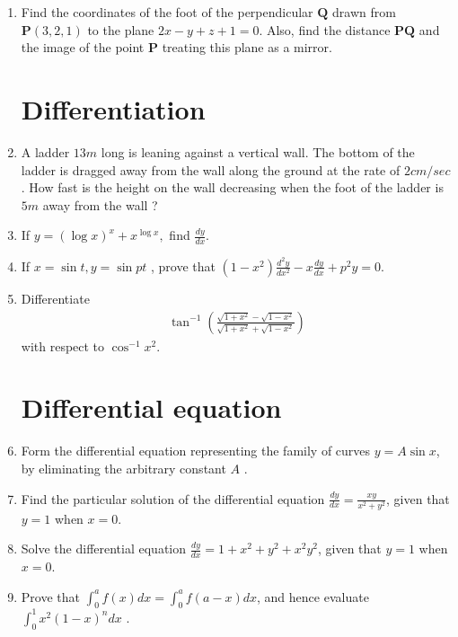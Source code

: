 \documentclass[10pt,-letter paper]{article}
\let\vec\mathbf{}
\let\vec\mathbf{}
\let\vec\mathbf{}
\providecommand{\brak}[1]{\ensuremath{\left(#1\right)}}
\begin{document}
\begin{enumerate}
\item Find the coordinates of the foot of the perpendicular $\vec{Q}$ drawn from $\vec{P}\brak{3, 2, 1}$ to the plane $2x - y + z + 1 = 0$. Also, find the distance $\vec{P}\vec{Q}$ and the image of the point $\vec{P}$ treating this plane as a mirror.

\section{Differentiation}


\item A ladder $13 m$ long is leaning against a vertical wall. The bottom of the ladder is dragged away from the wall along the ground at the rate of $2 cm/sec$. How fast is the height on the wall decreasing when the foot of the ladder is $5 m$ away from the wall ?


\item If $y=\brak{\log x}^{x}+x^{\log x},$ find $\frac{dy}{dx}$.


\item If $x = \sin t ,  y= \sin pt$ , prove that $\brak{1-x^{2}}\frac{d^{2}y}{d x^{2}} - x \frac{dy}{dx} + p^{2}y=0$.

\item Differentiate 
\begin{align*}
  \tan^{-1}\brak{\frac{\sqrt{1+x^{2}}-\sqrt{1-x^{2}}}{\sqrt{1+x^{2}}+\sqrt{1-x^{2}}}}
\end{align*} with respect to $\cos^{-1}x^{2}$.

\section{Differential equation}
\item Form the differential equation representing the family of curves $y = A \sin x $, by eliminating the arbitrary constant $A$ .

\item Find the particular solution of the differential equation $\frac{d y}{d x}=\frac{xy}{x^{2}+y^{2}}$, given that $y = 1$ when $x = 0$.

\item Solve the differential equation $\frac{dy} {dx} =1+x^{2}+y^{2}+x^{2}y^{2}$, given that $y = 1$ when $x = 0$.

\item Prove that $\int_{0}^{a} f \brak {x}d x = \int_{0}^{a} f\brak{a-x} d x$, and hence evaluate  $\int_{0}^{1} x^{2}\brak{1-x}^{n}dx$ .


\end{enumerate}
\end{document}

